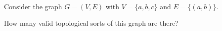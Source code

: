 \begin{prob}
    Consider the graph $G = (V, E)$ with $V = \{a, b, c\}$ and $E = \{(a, b)\}$.

    How many valid topological sorts of this graph are there?


\end{prob}
